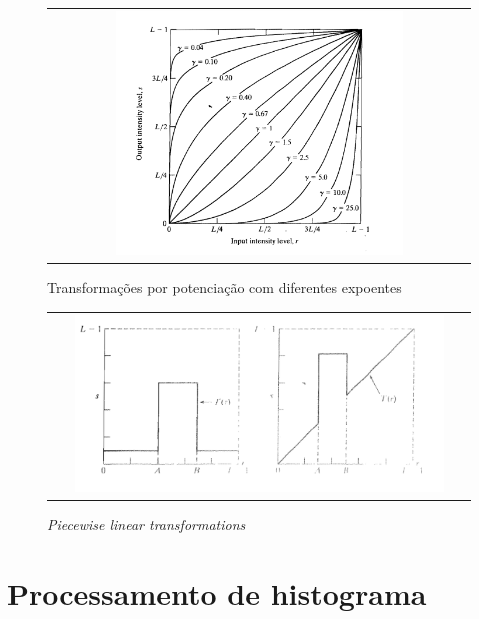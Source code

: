 \begin{figure}[!h]
  \begin{center}
    \begin{tabular}{c}
      \includegraphics[width=0.70\textwidth]{images/03/04.png}
    \end{tabular}
  \end{center}
  \caption{\label{fig:power} Transformações por potenciação com diferentes expoentes}
\end{figure}

\clearpage

\begin{figure}[!h]
  \begin{center}
    \begin{tabular}{c}
      \includegraphics[width=0.9\textwidth]{images/03/05.png}
    \end{tabular}
  \end{center}
  \caption{\label{fig:piece} \textit{Piecewise linear transformations}}
\end{figure}


\section{Processamento de histograma}

